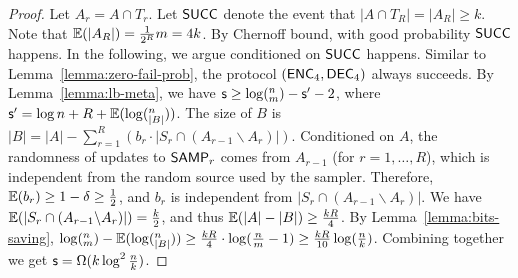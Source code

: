 \begin{proof}
  Let $A_r=A\cap T_r$. 
  Let $\textsf{SUCC}$ denote the event that $|A\cap T_R|=|A_R|\ge k$. 
  Note that $\operatorname*{\mathbb{E}}(|A_R|)=\frac{1}{2^R}m=4k$. By Chernoff bound, with good probability $\textsf{SUCC}$ happens. 
  In the following, we argue conditioned on $\textsf{SUCC}$ happens. 
  Similar to Lemma~\ref{lemma:zero-fail-prob}, the protocol $(\textsf{ENC}_4,\textsf{DEC}_4)$ always succeeds. 
  By Lemma~\ref{lemma:lb-meta}, we have $\textsf{s}\ge \log (^n_m) - \textsf{s}' -2$, where $\textsf{s}'=\log n + R+ \operatorname*{\mathbb{E}}(\log (^n_{|B|}))$. 
  The size of $B$ is $|B|=|A|-\sum_{r=1}^{R}{(b_r \cdot |S_r \cap (A_{r-1}\backslash A_r)|)}$.
  Conditioned on $A$, the randomness of updates to $\textsf{SAMP}_r$ comes from $A_{r-1}$ (for $r=1, \ldots, R$), which is independent from the random source used by the sampler.
  Therefore, $\operatorname*{\mathbb{E}}(b_r)\ge 1-\delta\ge \frac{1}{2}$, and $b_r$ is independent from $|S_r \cap (A_{r-1}\backslash A_r)|$. 
  We have $\operatorname*{\mathbb{E}}(|S_r \cap (A_{r-1}\backslash A_r)|)=\frac{k}{2}$, and thus $\operatorname*{\mathbb{E}}(|A|-|B|)\ge \frac{kR}{4}$. 
  By Lemma~\ref{lemma:bits-saving}, $\log (^n_m)-\operatorname*{\mathbb{E}}(\log (^n_{|B|}))\ge \frac{kR}{4}\cdot \log (\frac{n}{m}-1) \ge \frac{kR}{10}\log (\frac{n}{k})$. 
  Combining together we get $\textsf{s} = \Omega(k\log^2 \frac{n}{k} )$.
\end{proof}
